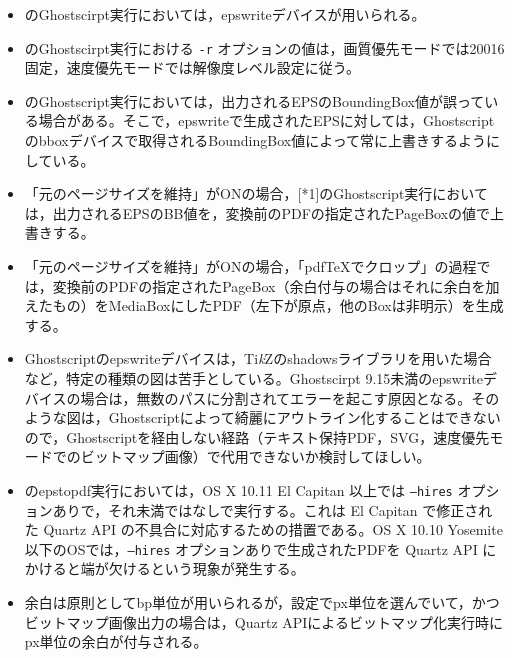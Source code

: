 \documentclass[uplatex,dvipdfmx,landscape]{jsarticle}
\newcommand*\TikZ{Ti\textit{k}Z}
\begin{document}
\begin{center}
\end{center}

\vspace{5mm}



{\baselineskip18pt
\begin{itemize}[leftmargin=2zw]
\item\relax[*1]のGhostscirpt実行においては，epswriteデバイスが用いられる。
\item\relax[*1]のGhostscirpt実行における \texttt{-r} オプションの値は，画質優先モードでは20016固定，速度優先モードでは解像度レベル設定に従う。
\item\relax[*1]のGhostscript実行においては，出力されるEPSのBoundingBox値が誤っている場合がある。そこで，epswriteで生成されたEPSに対しては，Ghostscriptのbboxデバイスで取得されるBoundingBox値によって常に上書きするようにしている。
\item 「元のページサイズを維持」がONの場合，[*1]のGhostscript実行においては，出力されるEPSのBB値を，変換前のPDFの指定されたPageBoxの値で上書きする。
\item 「元のページサイズを維持」がONの場合，「pdf\TeX でクロップ」の過程では，変換前のPDFの指定されたPageBox（余白付与の場合はそれに余白を加えたもの）をMediaBoxにしたPDF（左下が原点，他のBoxは非明示）を生成する。
\item Ghostscriptのepswriteデバイスは，\TikZ のshadowsライブラリを用いた場合など，特定の種類の図は苦手としている。Ghostscirpt 9.15未満のepswriteデバイスの場合は，無数のパスに分割されてエラーを起こす原因となる。そのような図は，Ghostscriptによって綺麗にアウトライン化することはできないので，Ghostscriptを経由しない経路（テキスト保持PDF，SVG，速度優先モードでのビットマップ画像）で代用できないか検討してほしい。
\item\relax[*2]のepstopdf実行においては，OS X 10.11 El Capitan 以上では \texttt{--hires} オプションありで，それ未満ではなしで実行する。これは El Capitan で修正された Quartz API の不具合に対応するための措置である。OS X 10.10 Yosemite 以下のOSでは，\texttt{--hires} オプションありで生成されたPDFを Quartz API にかけると端が欠けるという現象が発生する。
\item 余白は原則としてbp単位が用いられるが，設定でpx単位を選んでいて，かつビットマップ画像出力の場合は，Quartz APIによるビットマップ化実行時にpx単位の余白が付与される。
\end{itemize}
}
\end{document}
